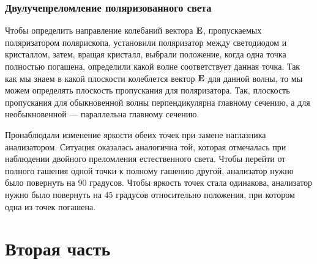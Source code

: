 \documentclass[12pt]{article}
\begin{document}
	\subsubsection{Двулучепреломление поляризованного света}
	Чтобы определить направление колебаний вектора $\vb{E}$, пропускаемых поляризатором полярископа, установили поляризатор между светодиодом и кристаллом, затем, вращая кристалл, выбрали положение, когда одна точка полностью погашена, определили какой волне соответствует данная точка. Так как мы знаем в какой плоскости колеблется вектор $\vb{E}$ для данной волны, то мы можем определять плоскость пропускания для поляризатора. Так, плоскость пропускания для обыкновенной волны перпендикулярна главному сечению, а для необыкновенной \---- параллельна главному сечению.
	\par Пронаблюдали изменение яркости обеих точек при замене наглазника анализатором. Ситуация оказалась аналогична той, которая отмечалась при наблюдении двойного преломления естественного света. Чтобы перейти от полного гашения одной точки к полному гашению другой, анализатор нужно было повернуть на 90 градусов. Чтобы яркость точек стала одинакова, анализатор нужно было повернуть на 45 градусов относительно положения, при котором одна из точек погашена.

	\section{Вторая часть}
\end{document}
